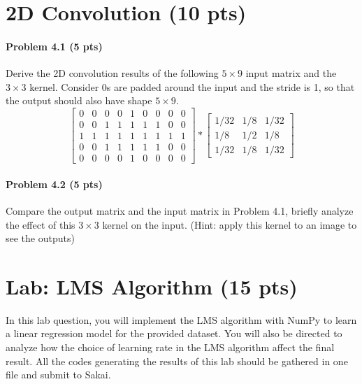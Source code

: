\section{2D Convolution (10 pts)}

\paragraph{Problem 4.1 (5 pts)}
Derive the 2D convolution results of the following $5\times9$ input matrix and the $3\times3$ kernel. Consider 0s are padded around the input and the stride is 1, so that the output should also have shape $5\times9$.
\begin{equation*}
    \begin{bmatrix}
    0 & 0 & 0 & 0 & 1 & 0 & 0 & 0 & 0\\
    0 & 0 & 1 & 1 & 1 & 1 & 1 & 0 & 0\\
    1 & 1 & 1 & 1 & 1 & 1 & 1 & 1 & 1\\
    0 & 0 & 1 & 1 & 1 & 1 & 1 & 0 & 0\\
    0 & 0 & 0 & 0 & 1 & 0 & 0 & 0 & 0
    \end{bmatrix} * 
    \begin{bmatrix}
    1/32 & 1/8 & 1/32 \\
    1/8 & 1/2 & 1/8\\
    1/32 & 1/8 & 1/32
    \end{bmatrix}
\end{equation*}

\paragraph{Problem 4.2 (5 pts)} Compare the output matrix and the input matrix in Problem 4.1, briefly analyze the effect of this $3\times3$ kernel on the input. (Hint: apply this kernel to an image to see the outputs)

\section{Lab: LMS Algorithm (15 pts)}

In this lab question, you will implement the LMS algorithm with NumPy to learn a linear regression model for the provided dataset. You will also be directed to analyze how the choice of learning rate in the LMS algorithm affect the final result. {\color{blue} All the codes generating the results of this lab should be gathered in one file and submit to Sakai.}

